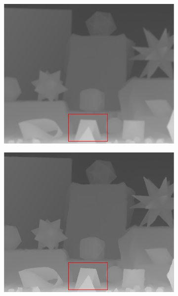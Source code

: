 \documentclass[preprint,10pt,5p,times,twocolumn]{elsarticle}
\begin{document}
\begin{figure}[t]
\begin{center}
\begin{subfigure}[b]{0.136\linewidth}
    \includegraphics[width=\linewidth]{cmp_moebius_8X_JBL.png}
    \label{fig:}
\end{subfigure}
\begin{subfigure}[b]{0.136\linewidth}
    \includegraphics[width=\linewidth]{cmp_moebius_8X_AR.png}
    \label{fig:} %
\end{subfigure}
\begin{subfigure}[b]{0.136\linewidth}

\end{subfigure}
\end{center}
\end{figure}
\end{document}

